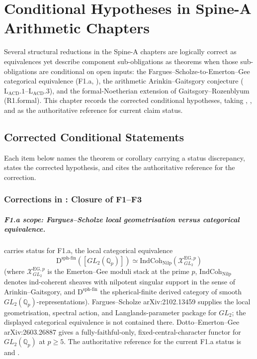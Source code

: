 \chapter{Conditional Hypotheses in Spine-A Arithmetic Chapters}
\label{v4-arith:w3-audit-A}

Several structural reductions in the Spine-A chapters are logically
correct as equivalences yet describe component sub-obligations as
theorems when those sub-obligations are conditional on open inputs:
the Fargues--Scholze-to-Emerton--Gee categorical equivalence
(F1.a, \ClaimStatusNeedsVerification), the arithmetic
Arinkin--Gaitsgory conjecture
(\(\mathrm{L}_{\mathrm{ACD}}.1\)--\(\mathrm{L}_{\mathrm{ACD}}.3\)),
and the formal-Noetherian extension of Gaitsgory--Rozenblyum
(R1.formal). This chapter records the corrected conditional
hypotheses, taking
,
, and
 as the authoritative reference for
current claim status.

\section{Corrected Conditional Statements}
\label{v4-arith:w3-audit-A:catalog}

Each item below names the theorem or corollary carrying a status
discrepancy, states the corrected hypothesis, and cites the
authoritative reference for the correction.

\subsection{Corrections in : Closure of F1--F3}
\label{v4-arith:w3-audit-A:ch22}

\paragraph{F1.a scope: Fargues--Scholze local geometrisation versus categorical equivalence.}
 carries status
\ClaimStatusNeedsVerification for F1.a, the local categorical
equivalence
\[
\mathrm{D}^{\mathrm{sph\text{-}fin}}([GL_{2}(\mathbb{Q}_{p})])
\simeq
\mathrm{IndCoh}_{\mathrm{Nilp}}(\mathcal{X}^{\mathrm{EG},p}_{GL_{2}})
\]
(where \(\mathcal{X}^{\mathrm{EG},p}_{GL_2}\) is the
Emerton--Gee moduli stack at the prime \(p\),
\(\mathrm{IndCoh}_{\mathrm{Nilp}}\) denotes ind-coherent sheaves
with nilpotent singular support in the sense of Arinkin--Gaitsgory,
and \(\mathrm{D}^{\mathrm{sph\text{-}fin}}\) the spherical-finite
derived category of smooth \(GL_2(\mathbb{Q}_p)\)-representations).
Fargues--Scholze arXiv:2102.13459 supplies the local geometrisation,
spectral action, and Langlands-parameter package for \(GL_2\); the
displayed categorical equivalence is not contained there.
Dotto--Emerton--Gee arXiv:2603.26887 gives a fully-faithful-only,
fixed-central-character functor for \(GL_{2}(\mathbb{Q}_{p})\) at
\(p\geq 5\). The authoritative reference for the current F1.a status
is  and
.

